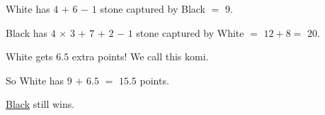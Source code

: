 \documentclass[a4paper,12pt]{extarticle}
\begin{document}
{\begin{center}
  {\Large White has \ul{$4$} $+$ \ul{$6$} $-$ \ul{$1$} stone captured by Black $=$ \ul{$9$}.

    Black has \ul{$4$} $\times$ \ul{$3$} $+$ \ul{$7$} $+$ \ul{$2$} $-$ \ul{$1$} stone captured by White $=$ $12 + 8 =$ \ul{$20$}.
  }

  \vspace{0.25cm}
  
  {\Large White gets $6.5$ extra points! We call this komi.

  So White has \ul{$9$} $+$ \ul{$6.5$} $=$ \ul{$15.5$} points.

  \ul{Black} still wins.}


  



\end{center}}
\end{document}
